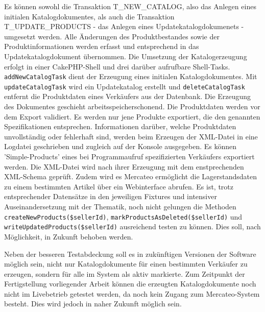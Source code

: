 {	Es können sowohl die Transaktion T\_NEW\_CATALOG, also das Anlegen eines initialen Katalogdokumentes, als auch die Transaktion T\_UPDATE\_PRODUCTS - das Anlegen eines Updatekatalogdokumenets - umgesetzt werden. 
	Alle Änderungen des Produktbestandes sowie der Produktinformationen werden erfasst und entsprechend in das Updatekatalogdokument übernommen.
	Die Umsetzung der Katalogerzeugung erfolgt in einer CakePHP-Shell und drei darüber aufrufbare Shell-Tasks. \texttt{addNewCatalogTask} dient der Erzeugung eines initialen Katalogdokumentes. Mit
	\texttt{updateCatalogTask} wird ein Updatekatalog erstellt und \texttt{deleteCatalogTask} entfernt die Produktdaten eines Verkäufers aus der Datenbank.
	Die Erzeugung des Dokumentes geschieht arbeitsspeicherschonend.
	Die Produktdaten werden vor dem Export validiert. Es werden nur jene Produkte exportiert, die den genannten Spezifikationen entsprechen. Informationen darüber, welche Produktdaten unvollständig oder fehlerhaft sind, werden beim Erzeugen der XML-Datei in eine Logdatei geschrieben und zugleich auf der Konsole ausgegeben. Es können 'Simple-Products' eines bei Programmaufruf spezifizierten Verkäufers exportiert werden. Die XML-Datei wird nach ihrer Erzeugung mit dem enstprechenden XML-Schema geprüft. 
	Zudem wird es Mercateo ermöglicht die Lagerstandsdaten zu einem bestimmten Artikel über ein Webinterface abrufen. 
	Es ist, trotz entsprechender Datensätze in den jeweiligen Fixtures und intensiver Auseinandersetzung mit der Thematik, noch nicht gelungen die Methoden \texttt{createNewProducts(\$sellerId)}, \texttt{markProductsAsDeleted(\$sellerId)} und \texttt{writeUpdatedProducts(\$sellerId)} ausreichend testen zu können. Dies soll, nach Möglichkeit, in Zukunft behoben werden.
	
	Neben der besseren Testabdeckung soll es in zukünftigen Versionen der Software möglich sein, nicht nur Katalogdokumente für einen bestimmten Verkäufer zu erzeugen, sondern für alle im System als aktiv markierte.
	Zum Zeitpunkt der Fertigstellung vorliegender Arbeit können die erzeugten Katalogdokumente noch nicht im Livebetrieb getestet werden, da noch kein Zugang zum Mercateo-System besteht. Dies wird jedoch in naher Zukunft möglich sein.
	
	

	
	
	
	
	\pagebreak
	\setcounter{page}{1}
	\begin{appendix}
	\pagebreak
		\listoffigures
		\pagebreak
		\listoftables
		\pagebreak
		\lstlistoflistings
	\pagebreak

\end{appendix}}
